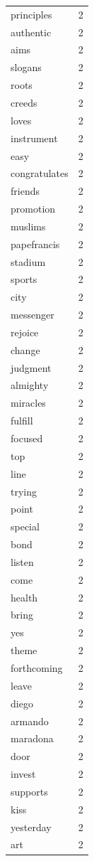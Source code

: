\begin{tabular}{lr}
principles & 2 \\
authentic & 2 \\
aims & 2 \\
slogans & 2 \\
roots & 2 \\
creeds & 2 \\
loves & 2 \\
instrument & 2 \\
easy & 2 \\
congratulates & 2 \\
friends & 2 \\
promotion & 2 \\
muslims & 2 \\
papefrancis & 2 \\
stadium & 2 \\
sports & 2 \\
city & 2 \\
messenger & 2 \\
rejoice & 2 \\
change & 2 \\
judgment & 2 \\
almighty & 2 \\
miracles & 2 \\
fulfill & 2 \\
focused & 2 \\
top & 2 \\
line & 2 \\
trying & 2 \\
point & 2 \\
special & 2 \\
bond & 2 \\
listen & 2 \\
come & 2 \\
health & 2 \\
bring & 2 \\
yes & 2 \\
theme & 2 \\
forthcoming & 2 \\
leave & 2 \\
diego & 2 \\
armando & 2 \\
maradona & 2 \\
door & 2 \\
invest & 2 \\
supports & 2 \\
kiss & 2 \\
yesterday & 2 \\
art & 2 \\

\end{tabular}
